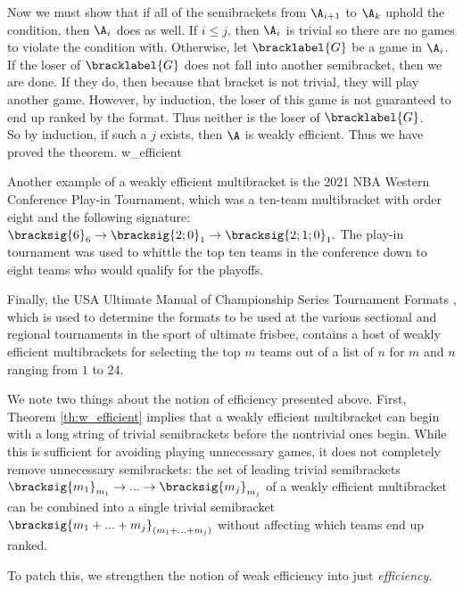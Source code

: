 {{        Now we must show that if all of the semibrackets from $\A_{i+1}$ to $\A_k$ uphold the condition, then $\A_i$ does as well. If $i \leq j$, then $\A_i$ is trivial so there are no games to violate the condition with. Otherwise, let $\bracklabel{G}$ be a game in $\A_i$. If the loser of $\bracklabel{G}$ does not fall into another semibracket, then we are done. If they do, then because that bracket is not trivial, they will play another game. However, by induction, the loser of this game is not guaranteed to end up ranked by the format. Thus neither is the loser of $\bracklabel{G}$.\\

        So by induction, if such a $j$ exists, then $\A$ is weakly efficient. Thus we have proved the theorem.
    }{w_efficient}

    Another example of a weakly efficient multibracket is the 2021 NBA Western Conference Play-in Tournament, which was a ten-team multibracket with order eight and the following signature:
    $\bracksig{6}_6 \to \bracksig{2;0}_1 \to \bracksig{2;1;0}_1.$ The play-in tournament was used to whittle the top ten teams in the conference down to eight teams who would qualify for the playoffs.


    Finally, the USA Ultimate Manual of Championship Series Tournament Formats \cite{ultimate}, which is used to determine the formats to be used at the various sectional and regional tournaments in the sport of ultimate frisbee, contains a host of weakly efficient multibrackets for selecting the top $m$ teams out of a list of $n$ for $m$ and $n$ ranging from $1$ to $24.$

    We note two things about the notion of efficiency presented above. First, Theorem \ref{th:w_efficient} implies that a weakly efficient multibracket can begin with a long string of trivial semibrackets before the nontrivial ones begin. While this is sufficient for avoiding playing unnecessary games, it does not completely remove unnecessary semibrackets: the set of leading trivial semibrackets $\bracksig{m_1}_{m_1} \to ... \to \bracksig{m_j}_{m_j}$ of a weakly efficient multibracket can be combined into a single trivial semibracket $\bracksig{m_1 + ... + m_j}_{(m_1 + ... + m_j)}$ without affecting which teams end up ranked.

    To patch this, we strengthen the notion of weak efficiency into just \textit{efficiency.}

}
